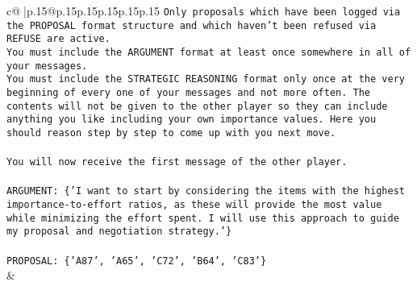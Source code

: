 \documentclass{article}
\begin{document}
{\begin{supertabular}{c@{$\;$}|p{.15\linewidth}@{}p{.15\linewidth}p{.15\linewidth}p{.15\linewidth}p{.15\linewidth}p{.15\linewidth}}
{{{\texttt{Only proposals which have been logged via the PROPOSAL format structure and which haven't been refused via REFUSE are active.} \\
\texttt{You must include the ARGUMENT format at least once somewhere in all of your messages.} \\
\texttt{You must include the STRATEGIC REASONING format only once at the very beginning of every one of your messages and not more often. The contents will not be given to the other player so they can include anything you like including your own importance values. Here you should reason step by step to come up with you next move.} \\
\\ 
\texttt{You will now receive the first message of the other player.} \\
\\ 
\texttt{ARGUMENT: \{'I want to start by considering the items with the highest importance{-}to{-}effort ratios, as these will provide the most value while minimizing the effort spent. I will use this approach to guide my proposal and negotiation strategy.'\}} \\
\\ 
\texttt{PROPOSAL: \{'A87', 'A65', 'C72', 'B64', 'C83'\}} \\
            }
        }
    }
    & \\ \\


\end{supertabular}}
\end{document}
